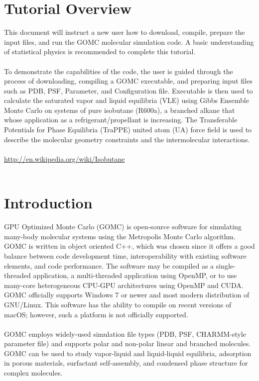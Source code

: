 \section{Tutorial Overview}
This document will instruct a new user how to download, compile, prepare the input files, and run the GOMC molecular simulation code.  A basic understanding of statistical physics is recommended to complete this tutorial.\\\\
To demonstrate the capabilities of the code, the user is guided through the process of downloading,  compiling a GOMC executable, and preparing input files such as PDB, PSF, Parameter, and Configuration file.  Executable is then used to calculate the saturated vapor and liquid equilibria (VLE) using Gibbs Ensemble Monte Carlo on systems of pure isobutane (R600a), a branched alkane that whose application as a refrigerant/propellant is increasing. The Transferable Potentials for Phase Equilibria (TraPPE) united atom (UA) force field is used to describe the molecular geometry constraints and the intermolecular interactions.\\\\
\url{http://en.wikipedia.org/wiki/Isobutane}\\\\

\section{Introduction}
GPU Optimized Monte Carlo (GOMC) is open-source software for simulating many-body molecular systems using the Metropolis Monte Carlo algorithm. GOMC is written in object oriented C++, which was chosen since it offers a good balance between code development time, interoperability with existing software elements, and code performance.  The software may be compiled as a single-threaded application, a multi-threaded application using OpenMP, or to use many-core heterogeneous CPU-GPU architectures using OpenMP and CUDA. GOMC officially supports Windows 7 or newer and most modern distribution of GNU/Linux. This software has the ability to compile on recent versions of macOS; however, such a platform is not officially supported.\\\\
GOMC employs widely-used simulation file types (PDB, PSF, CHARMM-style parameter file) and supports polar and non-polar linear and branched molecules. GOMC can be used to study vapor-liquid and liquid-liquid equilibria, adsorption in porous materials, surfactant self-assembly, and condensed phase structure for complex molecules.\\\\

